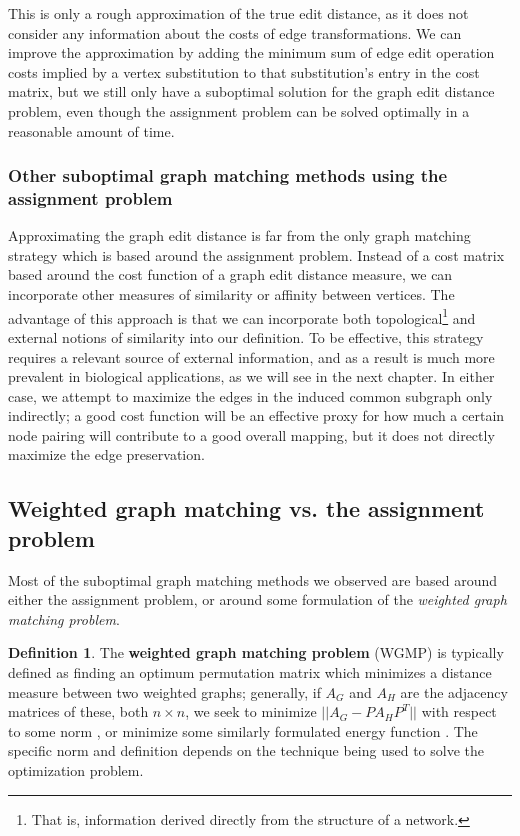 \documentclass[12pt]{thesis}
\theoremstyle{plain}
\theoremstyle{definition}
\newtheorem{definition}[theorem]{Definition}
\theoremstyle{remark}
\begin{document}
This is only a rough approximation of the true edit distance, as it does not consider any information about the costs of edge transformations. We can improve the approximation by adding the minimum sum of edge edit operation costs implied by a vertex substitution to that substitution's entry in the cost matrix, but we still only have a suboptimal solution for the graph edit distance problem, even though the assignment problem can be solved optimally in a reasonable amount of time.

\subsubsection{Other suboptimal graph matching methods using the assignment problem}

Approximating the graph edit distance is far from the only graph matching strategy which is based around the assignment problem. Instead of a cost matrix based around the cost function of a graph edit distance measure, we can incorporate other measures of similarity or affinity between vertices. The advantage of this approach is that we can incorporate both topological\footnote{That is, information derived directly from the structure of a network.} and external notions of similarity into our definition. To be effective, this strategy requires a relevant source of external information, and as a result is much more prevalent in biological applications, as we will see in the next chapter. In either case, we attempt to maximize the edges in the induced common subgraph only indirectly; a good cost function will be an effective proxy for how much a certain node pairing will contribute to a good overall mapping, but it does not directly maximize the edge preservation.

\subsection{Weighted graph matching vs. the assignment problem}

Most of the suboptimal graph matching methods we observed are based around either the assignment problem, or around some formulation of the \textit{weighted graph matching problem}.

\begin{definition}
The \textbf{weighted graph matching problem} (WGMP) is typically defined as finding an optimum permutation matrix which minimizes a distance measure between two weighted graphs; generally, if $A_G$ and $A_H$ are the adjacency matrices of these, both $n\times n$, we seek to minimize $||A_G - PA_HP^T||$ with respect to some norm \cite{Umeyama_1988, Koutra_2013, Almohamad_1993} , or minimize some similarly formulated energy function \cite{Gold_1996}. The specific norm and definition depends on the technique being used to solve the optimization problem.
\end{definition}
\end{document}
